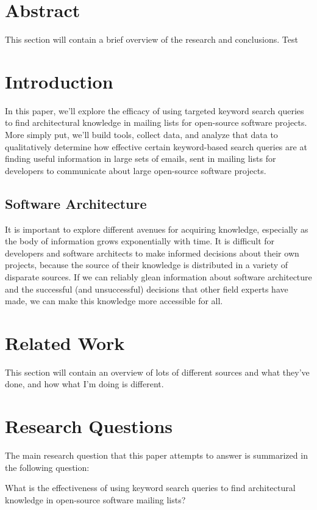 \documentclass[a4paper, 12pt]{article}
\begin{document}


\section{Abstract}
	This section will contain a brief overview of the research and conclusions. Test



\section{Introduction}
	In this paper, we'll explore the efficacy of using targeted keyword search queries to find architectural knowledge in mailing lists for open-source software projects. More simply put, we'll build tools, collect data, and analyze that data to qualitatively determine how effective certain keyword-based search queries are at finding useful information in large sets of emails, sent in mailing lists for developers to communicate about large open-source software projects.
	
	\subsection{Software Architecture}
		It is important to explore different avenues for acquiring knowledge, especially as the body of information grows exponentially with time. It is difficult for developers and software architects to make informed decisions about their own projects, because the source of their knowledge is distributed in a variety of disparate sources. If we can reliably glean information about software architecture and the successful (and unsuccessful) decisions that other field experts have made, we can make this knowledge more accessible for all.
	
\section{Related Work}
	This section will contain an overview of lots of different sources and what they've done, and how what I'm doing is different.

\section{Research Questions}
	The main research question that this paper attempts to answer is summarized in the following question:
	
	\begin{center}
		\large What is the effectiveness of using keyword search queries to find architectural knowledge in open-source software mailing lists?
	\end{center}
	
\end{document}
